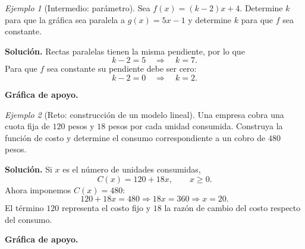 \documentclass[12pt]{article}
\theoremstyle{remark}
\newtheorem{ejemplo}{Ejemplo}[section]
\begin{document}
\begin{ejemplo}[Intermedio: parámetro]
Sea $f(x)=(k-2)x+4$. Determine $k$ para que la gráfica sea paralela a $g(x)=5x-1$ y determine $k$ para que $f$ sea constante.

\textbf{Solución.} Rectas paralelas tienen la misma pendiente, por lo que
\[
k-2=5\quad\Longrightarrow\quad \boxed{k=7}.
\]
Para que $f$ sea constante su pendiente debe ser cero:
\[
k-2=0\quad\Longrightarrow\quad \boxed{k=2}.
\]


\textbf{Gráfica de apoyo.}\medskip
\begin{center}
\end{center}

\end{ejemplo}

\begin{ejemplo}[Reto: construcción de un modelo lineal]
Una empresa cobra una cuota fija de $120$ pesos y $18$ pesos por cada unidad consumida. Construya la función de costo y determine el consumo correspondiente a un cobro de $480$ pesos.

\textbf{Solución.} Si $x$ es el número de unidades consumidas,
\[
C(x)=120+18x,\qquad x\ge0.
\]
Ahora imponemos $C(x)=480$:
\[
120+18x=480\Longrightarrow 18x=360\Longrightarrow \boxed{x=20}.
\]
El término $120$ representa el costo fijo y $18$ la razón de cambio del costo respecto del consumo.


\textbf{Gráfica de apoyo.}\medskip
\begin{center}
\end{center}

\end{ejemplo}
\end{document}
